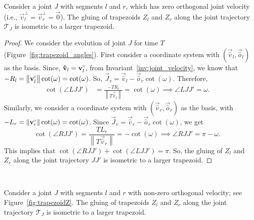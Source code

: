 \begin{lemma}
\label{lem:trapezoid_gluing_parallel}
Consider a joint $J$ with segments $l$ and $r$,
which has zero orthogonal joint velocity (i.e., $\vec v_l^\perp = \vec v_r^\perp = \vec 0$).
The gluing of trapezoids $Z_l$ and $Z_r$ along the joint trajectory $\mathcal T_J$ is isometric to a larger trapezoid.
\end{lemma}
\begin{proof}
We consider the evolution of joint $J$ for time $T$ (Figure~\ref{fig:trapezoid_angles}).
First consider a coordinate system with $(\vec{\hat v}_l, \vec{\hat o}_l)$ as the basis.
Since, $\vec{\hat v}_l = \vec v_l^\shortparallel$, from Invariant~\ref{inv:joint_velocity},
we know that $-R_l = \left\| \vec v_l^\shortparallel\right\|\cot(\omega) = \cot(\omega)$.
So, $\vec J_v = \vec{\hat v}_l - \vec{\hat o}_v\cot(\omega)$.  Therefore,
\begin{align*}
    \cot(\angle LJJ') &= \frac{-T R_l}{ \left\| T\vec{\hat v}_l\right\|} = \cot(\omega)
    \implies \angle LJJ' = \omega.
\end{align*}
Similarly, we consider a coordinate system with $(\vec{\hat v}_r, \vec{\hat
o}_r)$ as the basis, with $-L_r = \left\| \vec v_r^\shortparallel\right\|\cot(\omega) = \cot(\omega)$.
Since $\vec J_v = \vec{\hat v}_r - \vec{\hat o}_r \cot(\omega)$, we get
$$
\cot(\angle RJJ') = \frac{T L_r}{ \left\| T\vec{\hat v}_r\right\|} = -\cot(\omega)
\implies \angle RJJ' = \pi - \omega.
$$
This implies that $\cot(\angle RJJ') + \cot(\angle LJJ') = \pi$.
So, the gluing of $Z_l$ and $Z_r$ along the joint trajectory $JJ'$ is isometric to a larger trapezoid.
\end{proof}



~
\vspace*{-4ex}

\begin{lemma}
\label{lem:trapezoid_gluing}
Consider a joint $J$ with segments $l$ and $r$ with non-zero orthogonal velocity; see Figure~\ref{fig:trapezoidZ}.
The gluing of trapezoids $Z_l$ and $Z_r$ along the joint trajectory $\mathcal T_J$ is isometric to a larger trapezoid.
\end{lemma}

